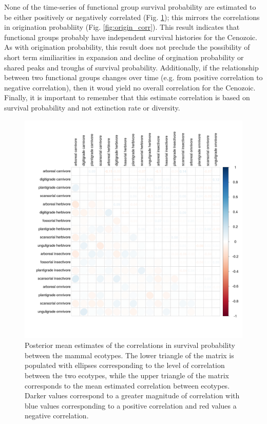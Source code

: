 \documentclass[12pt,letterpaper]{article}
\begin{document}
None of the time-series of functional group survival probability are estimated to be either positively or negatively correlated (Fig. \ref{fig:survival_corr}); this mirrors the correlations in origination probabliity (Fig. \ref{fig:origin_corr}). This result indicates that functional groups probably have independent survival histories for the Cenozoic. As with origination probability, this result does not preclude the possibility of short term similiarities in expansion and decline of orgination probability or shared peaks and troughs of survival probability. Additionally, if the relationship between two functional groups changes over time (e.g. from positive correlation to negative correlation), then it woud yield no overall correlation for the Cenozoic. Finally, it is important to remember that this estimate correlation is based on survival probability and not extinction rate or diversity.
\begin{figure}[ht]
  \centering
  \includegraphics[width=\textwidth,height=\textheight,keepaspectratio=true]{figure/survival_correlation}
  \caption[Estimated correlations in survival probability between ecotypes]{Posterior mean estimates of the correlations in survival probability between the mammal ecotypes. The lower triangle of the matrix is populated with ellipses corresponding to the level of correlation between the two ecotypes, while the upper triangle of the matrix corresponds to the mean estimated correlation between ecotypes. Darker values correspond to a greater magnitude of correlation with blue values corresponding to a positive correlation and red values a negative correlation.}
  \label{fig:survival_corr}
\end{figure}
\end{document}
